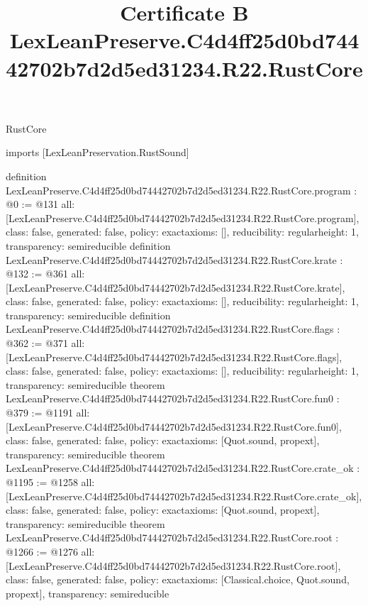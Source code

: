\begin{lexlean}{RustCore}
\title{Certificate B LexLeanPreserve.C4d4ff25d0bd74442702b7d2d5ed31234.R22.RustCore}
\begin{coremodule}
imports [LexLeanPreservation.RustSound]

definition LexLeanPreserve.C4d4ff25d0bd74442702b7d2d5ed31234.R22.RustCore.program : @0 := @131 {
  all: [LexLeanPreserve.C4d4ff25d0bd74442702b7d2d5ed31234.R22.RustCore.program],
  class: false,
  generated: false,
  policy: exact{axioms: []},
  reducibility: regular{height: 1},
  transparency: semireducible
}
definition LexLeanPreserve.C4d4ff25d0bd74442702b7d2d5ed31234.R22.RustCore.krate : @132 := @361 {
  all: [LexLeanPreserve.C4d4ff25d0bd74442702b7d2d5ed31234.R22.RustCore.krate],
  class: false,
  generated: false,
  policy: exact{axioms: []},
  reducibility: regular{height: 1},
  transparency: semireducible
}
definition LexLeanPreserve.C4d4ff25d0bd74442702b7d2d5ed31234.R22.RustCore.flags : @362 := @371 {
  all: [LexLeanPreserve.C4d4ff25d0bd74442702b7d2d5ed31234.R22.RustCore.flags],
  class: false,
  generated: false,
  policy: exact{axioms: []},
  reducibility: regular{height: 1},
  transparency: semireducible
}
theorem LexLeanPreserve.C4d4ff25d0bd74442702b7d2d5ed31234.R22.RustCore.fun0 : @379 := @1191 {
  all: [LexLeanPreserve.C4d4ff25d0bd74442702b7d2d5ed31234.R22.RustCore.fun0],
  class: false,
  generated: false,
  policy: exact{axioms: [Quot.sound, propext]},
  transparency: semireducible
}
theorem LexLeanPreserve.C4d4ff25d0bd74442702b7d2d5ed31234.R22.RustCore.crate_ok : @1195 := @1258 {
  all: [LexLeanPreserve.C4d4ff25d0bd74442702b7d2d5ed31234.R22.RustCore.crate_ok],
  class: false,
  generated: false,
  policy: exact{axioms: [Quot.sound, propext]},
  transparency: semireducible
}
theorem LexLeanPreserve.C4d4ff25d0bd74442702b7d2d5ed31234.R22.RustCore.root : @1266 := @1276 {
  all: [LexLeanPreserve.C4d4ff25d0bd74442702b7d2d5ed31234.R22.RustCore.root],
  class: false,
  generated: false,
  policy: exact{axioms: [Classical.choice, Quot.sound, propext]},
  transparency: semireducible
}


\end{coremodule}
\end{lexlean}
